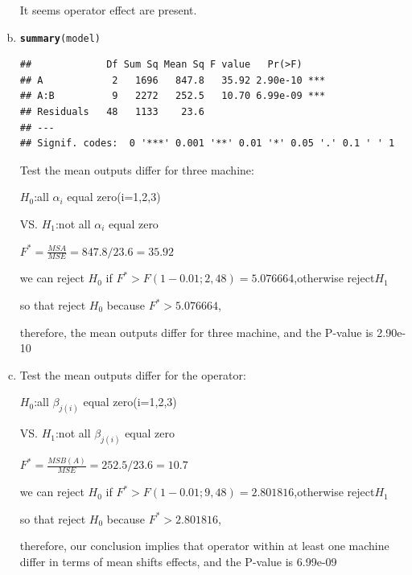 \documentclass{article}\usepackage[]{graphicx}\usepackage[]{color}
\makeatletter
\newcommand{\hlstd}[1]{\textcolor[rgb]{0.345,0.345,0.345}{#1}}%
\newcommand{\hlkwd}[1]{\textcolor[rgb]{0.737,0.353,0.396}{\textbf{#1}}}%
\newenvironment{kframe}{%
 \def\at@end@of@kframe{}%
 \ifinner\ifhmode%
  \def\at@end@of@kframe{\end{minipage}}%
  \begin{minipage}{\columnwidth}%
 \fi\fi%
 \def\FrameCommand##1{\hskip\@totalleftmargin \hskip-\fboxsep
 \colorbox{shadecolor}{##1}\hskip-\fboxsep
     \hskip-\linewidth \hskip-\@totalleftmargin \hskip\columnwidth}%
 \MakeFramed {\advance\hsize-\width
   \@totalleftmargin\z@ \linewidth\hsize
   \@setminipage}}%
 {\par\unskip\endMakeFramed%
 \at@end@of@kframe}
\newenvironment{knitrout}{}{} %
\makeatother
\begin{document}
\begin{enumerate}[(a)]
\begin{knitrout}
\end{knitrout}

\qquad It seems operator effect are present.

\item

\begin{knitrout}
\color{fgcolor}\begin{kframe}
\begin{alltt}
  \hlkwd{summary}\hlstd{(model)}
\end{alltt}
\begin{verbatim}
##             Df Sum Sq Mean Sq F value   Pr(>F)    
## A            2   1696   847.8   35.92 2.90e-10 ***
## A:B          9   2272   252.5   10.70 6.99e-09 ***
## Residuals   48   1133    23.6                     
## ---
## Signif. codes:  0 '***' 0.001 '**' 0.01 '*' 0.05 '.' 0.1 ' ' 1
\end{verbatim}
\end{kframe}
\end{knitrout}

Test the mean outputs differ for three machine:

\begin{center}
$H_0$:all $\alpha_i$ equal zero(i=1,2,3)

VS. $H_1$:not all $\alpha_i$ equal zero

$F^*=\frac{MSA}{MSE} = 847.8/23.6  = 35.92$

we can reject $H_0$ if $F^* > F(1-0.01;2,48)=5.076664$,otherwise reject$H_1$

so that reject $H_0$ because $F^*>5.076664$,

therefore, the mean outputs differ for three machine, and the P-value is 2.90e-10
\end{center}

\item

Test the mean outputs differ for the operator:

\begin{center}
$H_0$:all $\beta_{j(i)}$ equal zero(i=1,2,3)

VS. $H_1$:not all $\beta_{j(i)}$ equal zero

$F^*=\frac{MSB(A)}{MSE} = 252.5/23.6  = 10.7$

we can reject $H_0$ if $F^* > F(1-0.01;9,48)=2.801816$,otherwise reject$H_1$

so that reject $H_0$ because $F^*>2.801816$,

therefore, our conclusion implies that operator within at least one machine differ in terms of mean shifts effects, and the P-value is 6.99e-09
\end{center}


\end{enumerate}
\end{document}
